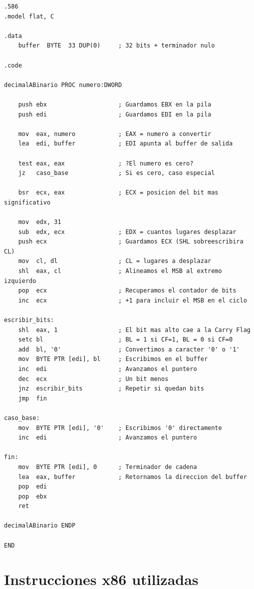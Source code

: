 \documentclass[12pt, letterpaper]{article}
\begin{document}
\begin{lstlisting}[language=MASM, caption={conversion.asm --- Conversión de decimal a binario}]
.586
.model flat, C

.data
    buffer  BYTE  33 DUP(0)     ; 32 bits + terminador nulo

.code

decimalABinario PROC numero:DWORD

    push ebx                    ; Guardamos EBX en la pila
    push edi                    ; Guardamos EDI en la pila

    mov  eax, numero            ; EAX = numero a convertir
    lea  edi, buffer            ; EDI apunta al buffer de salida

    test eax, eax               ; ?El numero es cero?
    jz   caso_base              ; Si es cero, caso especial

    bsr  ecx, eax               ; ECX = posicion del bit mas significativo

    mov  edx, 31
    sub  edx, ecx               ; EDX = cuantos lugares desplazar
    push ecx                    ; Guardamos ECX (SHL sobreescribira CL)
    mov  cl, dl                 ; CL = lugares a desplazar
    shl  eax, cl                ; Alineamos el MSB al extremo izquierdo
    pop  ecx                    ; Recuperamos el contador de bits
    inc  ecx                    ; +1 para incluir el MSB en el ciclo

escribir_bits:
    shl  eax, 1                 ; El bit mas alto cae a la Carry Flag
    setc bl                     ; BL = 1 si CF=1, BL = 0 si CF=0
    add  bl, '0'                ; Convertimos a caracter '0' o '1'
    mov  BYTE PTR [edi], bl     ; Escribimos en el buffer
    inc  edi                    ; Avanzamos el puntero
    dec  ecx                    ; Un bit menos
    jnz  escribir_bits          ; Repetir si quedan bits
    jmp  fin

caso_base:
    mov  BYTE PTR [edi], '0'    ; Escribimos '0' directamente
    inc  edi                    ; Avanzamos el puntero

fin:
    mov  BYTE PTR [edi], 0      ; Terminador de cadena
    lea  eax, buffer            ; Retornamos la direccion del buffer
    pop  edi
    pop  ebx
    ret

decimalABinario ENDP

END
\end{lstlisting}

\section{Instrucciones x86 utilizadas}
\end{document}
